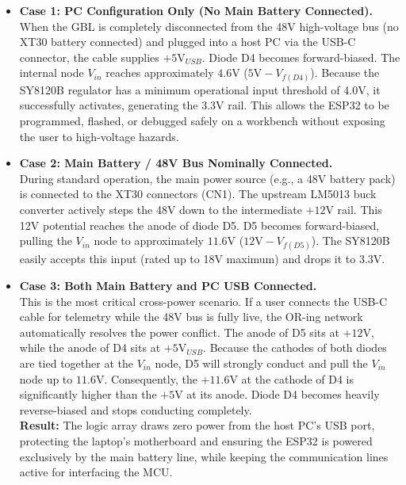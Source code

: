 \documentclass[11pt,a4paper]{article}
\begin{document}
\begin{itemize}
\item \textbf{Case 1: PC Configuration Only (No Main Battery Connected).} \\
When the GBL is completely disconnected from the 48V high-voltage bus (no XT30 battery connected) and plugged into a host PC via the USB-C connector, the cable supplies $+5\text{V}_{USB}$. Diode D4 becomes forward-biased. The internal node $V_{in}$ reaches approximately $4.6\text{V}$ ($5\text{V} - V_{f(D4)}$). Because the SY8120B regulator has a minimum operational input threshold of 4.0V, it successfully activates, generating the 3.3V rail. This allows the ESP32 to be programmed, flashed, or debugged safely on a workbench without exposing the user to high-voltage hazards.

\item \textbf{Case 2: Main Battery / 48V Bus Nominally Connected.} \\
During standard operation, the main power source (e.g., a 48V battery pack) is connected to the XT30 connectors (CN1). The upstream LM5013 buck converter actively steps the 48V down to the intermediate $+12\text{V}$ rail. This 12V potential reaches the anode of diode D5. D5 becomes forward-biased, pulling the $V_{in}$ node to approximately $11.6\text{V}$ ($12\text{V} - V_{f(D5)}$). The SY8120B easily accepts this input (rated up to 18V maximum) and drops it to 3.3V. 

\item \textbf{Case 3: Both Main Battery and PC USB Connected.} \\
This is the most critical cross-power scenario. If a user connects the USB-C cable for telemetry while the 48V bus is fully live, the OR-ing network automatically resolves the power conflict. The anode of D5 sits at $+12\text{V}$, while the anode of D4 sits at $+5\text{V}_{USB}$. Because the cathodes of both diodes are tied together at the $V_{in}$ node, D5 will strongly conduct and pull the $V_{in}$ node up to $11.6\text{V}$. Consequently, the $+11.6\text{V}$ at the cathode of D4 is significantly higher than the $+5\text{V}$ at its anode. Diode D4 becomes heavily reverse-biased and stops conducting completely. \\ 
\textbf{Result:} The logic array draws zero power from the host PC's USB port, protecting the laptop's motherboard and ensuring the ESP32 is powered exclusively by the main battery line, while keeping the communication lines active for interfacing the MCU.

\end{itemize}
\end{document}
